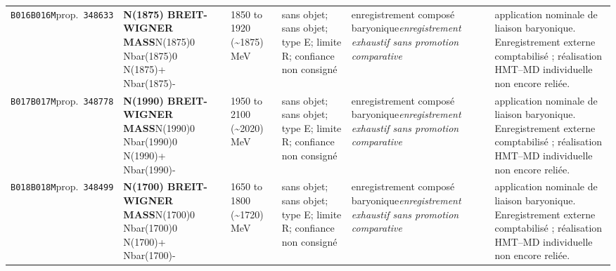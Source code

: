 \begin{landscape}
\begin{longtable}{L{1.85cm}L{4.45cm}L{2.35cm}L{4.05cm}L{3.35cm}L{7.15cm}}
\texttt{B016}\newline \texttt{B016M}\newline prop.\ \texttt{348633} & \textbf{N(1875) BREIT-WIGNER MASS}\newline N(1875)0 \textbar{}\allowbreak{} Nbar(1875)0 \textbar{}\allowbreak{} N(1875)+ \textbar{}\allowbreak{} Nbar(1875)- & 1850 to 1920 (\textasciitilde{}1875)\,MeV & sans objet; sans objet; type E; limite R; confiance non consigné & enregistrement composé baryonique\newline \emph{enregistrement exhaustif sans promotion comparative} & application nominale de liaison baryonique. Enregistrement externe comptabilisé ; réalisation HMT--MD individuelle non encore reliée. \\
\texttt{B017}\newline \texttt{B017M}\newline prop.\ \texttt{348778} & \textbf{N(1990) BREIT-WIGNER MASS}\newline N(1990)0 \textbar{}\allowbreak{} Nbar(1990)0 \textbar{}\allowbreak{} N(1990)+ \textbar{}\allowbreak{} Nbar(1990)- & 1950 to 2100 (\textasciitilde{}2020)\,MeV & sans objet; sans objet; type E; limite R; confiance non consigné & enregistrement composé baryonique\newline \emph{enregistrement exhaustif sans promotion comparative} & application nominale de liaison baryonique. Enregistrement externe comptabilisé ; réalisation HMT--MD individuelle non encore reliée. \\
\texttt{B018}\newline \texttt{B018M}\newline prop.\ \texttt{348499} & \textbf{N(1700) BREIT-WIGNER MASS}\newline N(1700)0 \textbar{}\allowbreak{} Nbar(1700)0 \textbar{}\allowbreak{} N(1700)+ \textbar{}\allowbreak{} Nbar(1700)- & 1650 to 1800 (\textasciitilde{}1720)\,MeV & sans objet; sans objet; type E; limite R; confiance non consigné & enregistrement composé baryonique\newline \emph{enregistrement exhaustif sans promotion comparative} & application nominale de liaison baryonique. Enregistrement externe comptabilisé ; réalisation HMT--MD individuelle non encore reliée. \\

\end{longtable}
\end{landscape}
